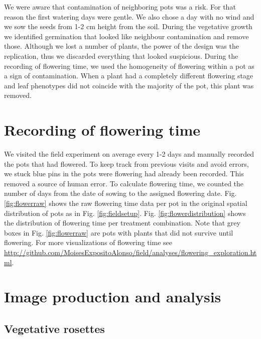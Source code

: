 \documentclass[12pt,]{article}
\begin{document}
We were aware that contamination of neighboring pots was a risk. For
that reason the first watering days were gentle. We also chose a day
with no wind and we sow the seeds from 1-2 cm height from the soil.
During the vegetative growth we identified germination that looked like
neighbour contamination and remove those. Although we lost a number of
plants, the power of the design was the replication, thus we discarded
everything that looked suspicious. During the recording of flowering
time, we used the homogeneity of flowering within a pot as a sign of
contamination. When a plant had a completely different flowering stage
and leaf phenotypes did not coincide with the majority of the pot, this
plant was removed.

\section{Recording of flowering time}\label{recording-of-flowering-time}

We visited the field experiment on average every 1-2 days and manually
recorded the pots that had flowered. To keep track from previous visits
and avoid errors, we stuck blue pins in the pots were flowering had
already been recorded. This removed a source of human error. To
calculate flowering time, we counted the number of days from the date of
sowing to the assigned flowering date. Fig. \ref{fig:flowerraw} shows
the raw flowering time data per pot in the original spatial distribution
of pots as in Fig. \ref{fig:fieldsetup}. Fig.
\ref{fig:flowerdistribution} shows the distribution of flowering time
per treatment combination. Note that grey boxes in Fig.
\ref{fig:flowerraw} are pots with plants that did not survive until
flowering. For more visualizations of flowering time see
\url{http://github.com/MoisesExpositoAlonso/field/analyses/flowering_exploration.html}.

\section{Image production and
analysis}\label{image-production-and-analysis}

\subsection{Vegetative rosettes}\label{vegetative-rosettes}
\end{document}
